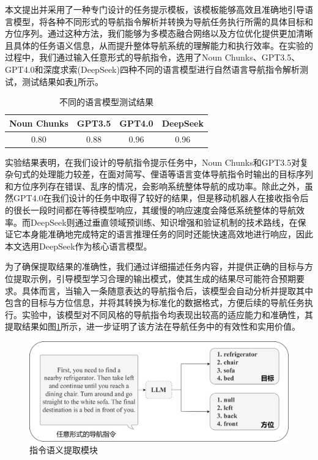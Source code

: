 本文提出并采用了一种专门设计的任务提示模板，该模板能够高效且准确地引导语言模型，将各种不同形式的导航指令解析并转换为导航任务执行所需的具体目标和方位序列。通过这种方法，我们能够为多模态融合网络以及方位优化提供更加清晰且具体的任务语义信息，从而提升整体导航系统的理解能力和执行效率。在实验的过程中，我们通过输入任意形式的导航指令，选用了Noun Chunks、GPT3.5、GPT4.0和深度求索(DeepSeek)四种不同的语言模型进行自然语言导航指令解析测试，测试结果如表\ref{deepseekcmp}所示。
\begin{table}
\caption{\label{deepseekcmp}不同的语言模型测试结果}
\centering
\small
\begin{tabular}{cccc}
    \hline
    Noun Chunks & GPT3.5 & GPT4.0 & DeepSeek \tabularnewline 
    \hline 
    0.80 & 0.88 & 0.96 & 0.96 \tabularnewline
    \hline 
\end{tabular}
\end{table}
实验结果表明，在我们设计的导航指令提示任务中，Noun Chunks和GPT3.5对复杂句式的处理能力较差，在面对简写、俚语等语言变体导航指令时输出的目标序列和方位序列存在错误、乱序的情况，会影响系统整体导航的成功率。除此之外，虽然GPT4.0在我们设计的任务中取得了较好的结果，但是移动机器人在接收指令后的很长一段时间都在等待模型响应，其缓慢的响应速度会降低系统整体的导航效率。而DeepSeek则通过垂直领域预训练、知识增强和验证机制的技术路线，在保证它本身能准确地完成特定的语言推理任务的同时还能快速高效地进行响应，因此本文选用DeepSeek\cite{guo2025deepseek}作为核心语言模型。

为了确保提取结果的准确性，我们通过详细描述任务内容，并提供正确的目标与方位提取示例，引导模型学习合理的输出模式，使其生成的结果尽可能符合预期要求。具体而言，当输入一条随意表达的导航指令后，该模型会自动分析并提取其中包含的目标与方位信息，并将其转换为标准化的数据格式，方便后续的导航任务执行。实验中，该模型对不同风格的导航指令均表现出较高的适应能力和准确性，其提取结果如图\ref{Extract_orien}所示，进一步证明了该方法在导航任务中的有效性和实用价值。


\begin{figure}[htbp]
    \centering
    \includegraphics[scale=0.05]{Fig/Extract_orien.png}
    \caption{\label{Extract_orien}指令语义提取模块}
\end{figure}





